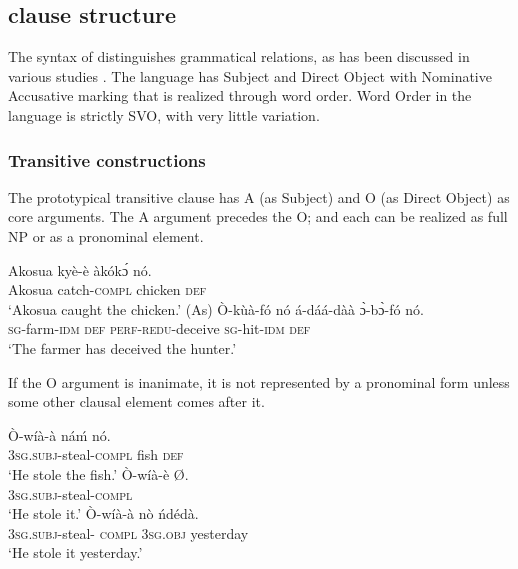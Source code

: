 \documentclass[output=paper]{langsci/langscibook}
\begin{document}
\subsection{ clause structure}\label{§2.3:akan.osam}

The syntax of  distinguishes grammatical relations, as has been discussed in various studies \citep{osam1994a,osam1996,osam1997,osam2000,osam2004}. The language has Subject and Direct Object with Nominative Accusative marking that is realized through word order. Word Order in the language is strictly SVO, with very little variation.

\subsubsection{Transitive constructions}\label{§2.3.1:transitive.osam}

The prototypical  transitive clause has A (as Subject) and O (as Direct Object) as core arguments. The A argument precedes the O; and each can be realized as full NP or as a pronominal element.

\ea\label{ex:14.osam}
\ea\label{ex:14a.osam}
\gll  Akosua    kyè-è    àkókɔ́    nó.\\
       Akosua  catch-\textsc{compl}  chicken  \textsc{def}\\
\glt   `Akosua caught the chicken.' (As)
\ex\label{ex:14b.osam}
\gll    Ò-kùà-fó    nó  á-dáá-dàà    ɔ̀-bɔ̀-fó    nó.\\
       \textsc{sg}-farm-\textsc{idm}    \textsc{def}  \textsc{perf-redu}-deceive  \textsc{sg}-hit-\textsc{idm}  \textsc{def}\\
\glt   `The farmer has deceived the hunter.'
\z 
\z 

If the O argument is inanimate, it is not represented by a pronominal form unless some other clausal element comes after it.

\ea\label{ex:15.osam}
\ea\label{ex:15a.osam}
\gll   Ò-wíà-à    náḿ  nó.\\
       \textsc{3sg.subj}-steal-\textsc{compl}  fish  \textsc{def}\\
\glt   `He stole the fish.'
\ex\label{ex:15b.osam}
\gll   Ò-wíà-è      Ø.\\
       \textsc{3sg.subj}-steal-\textsc{compl}\\
\glt   `He stole it.'
\ex\label{ex:15c.osam}
\gll   Ò-wíà-à      nò    ńdédà.\\
       \textsc{3sg.subj}-steal-\textsc{ compl}  \textsc{3sg.obj}  yesterday\\
\glt   `He stole it yesterday.'
\z 
\z 
\end{document}
